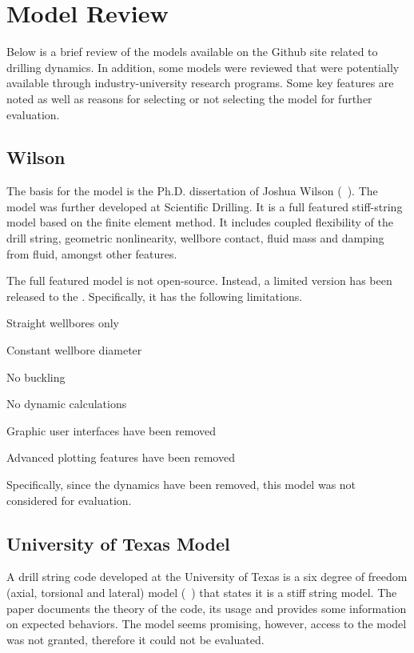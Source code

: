 \chapter{Model Review}
\label{ch:modelreview}
Below is a brief review of the models available on the \osdc{} Github site related to drilling dynamics.  In addition, some models were reviewed that were potentially available through industry-university research programs.  Some key features are noted as well as reasons for selecting or not selecting the model for further evaluation.

\section{Wilson}
The basis for the model is the Ph.D. dissertation of Joshua Wilson (~\cite{ref:wilson2017a}).  The model was further developed at Scientific Drilling.  It is a full featured stiff-string model based on the finite element method.  It includes coupled flexibility of the drill string, geometric nonlinearity, wellbore contact, fluid mass and damping from fluid, amongst other features.

The full featured model is not open-source.  Instead, a limited version has been released to the \osdc{}.  Specifically, it has the following limitations.
\begin{bulletedlist}
	\item Straight wellbores only
	\item Constant wellbore diameter
	\item No buckling
	\item No dynamic calculations
	\item Graphic user interfaces have been removed
	\item Advanced plotting features have been removed
\end{bulletedlist}
Specifically, since the dynamics have been removed, this model was not considered for evaluation.

\section{University of Texas Model}
A drill string code developed at the University of Texas is a six degree of freedom  (axial, torsional and lateral) model (~\cite{ref:zhang2023a}) that states it is a stiff string model.  The paper documents the theory of the code, its usage and provides some information on expected behaviors.  The model seems promising, however, access to the model was not granted, therefore it could not be evaluated.

